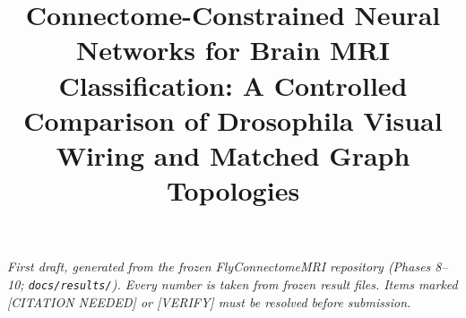 \documentclass[conference]{IEEEtran}
\begin{document}
\nocite{cheng2015enhanced,cheng2024dataset,malecns,neuprint,flyvis,ncnn,cheng2016retrieval}

\title{Connectome-Constrained Neural Networks for Brain MRI Classification: A Controlled Comparison of Drosophila Visual Wiring and Matched Graph Topologies}

\author{}

\maketitle

\begin{center}
\footnotesize \emph{First draft, generated from the frozen FlyConnectomeMRI repository (Phases 8–10; \texttt{docs/results/}). Every number is taken from frozen result files. Items marked [CITATION NEEDED] or [VERIFY] must be resolved before submission.}
\end{center}


















\end{document}
